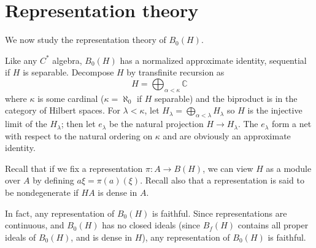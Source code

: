 \documentclass[12pt]{report}
\newcommand{\CC}{\mathbb{C}}
\theoremstyle{definition}
\begin{document}
\section{Representation theory}
We now study the representation theory of $B_0(H)$.

Like any $C^*$ algebra, $B_0(H)$ has a normalized approximate identity, sequential if $H$ is separable. Decompose $H$ by transfinite recursion as
$$H = \bigoplus_{\alpha < \kappa} \CC$$
where $\kappa$ is some cardinal ($\kappa = \aleph_0$ if $H$ separable) and the biproduct is in the category of Hilbert spaces. For $\lambda < \kappa$, let $H_\lambda = \bigoplus_{\alpha < \lambda} H_\lambda$ so $H$ is the injective limit of the $H_\lambda$; then let $e_\lambda$ be the natural projection $H \to H_\lambda$. The $e_\lambda$ form a net with respect to the natural ordering on $\kappa$ and are obviously an approximate identity.

Recall that if we fix a representation $\pi: A \to B(H)$, we can view $H$ as a module over $A$ by defining $a\xi = \pi(a)(\xi)$. Recall also that a representation is said to be nondegenerate if $HA$ is dense in $A$.

In fact, any representation of $B_0(H)$ is faithful. Since representations are continuous, and $B_0(H)$ has no closed ideals (since $B_f(H)$ contains all proper ideals of $B_0(H)$, and is dense in $H$), any representation of $B_0(H)$ is faithful.
\end{document}
